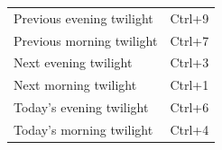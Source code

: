 \begin{tabular}{ll}
  Previous evening twilight & Ctrl+9 \\
  Previous morning twilight & Ctrl+7 \\
  Next evening twilight     & Ctrl+3 \\
  Next morning twilight     & Ctrl+1 \\
  Today's evening twilight  & Ctrl+6 \\
  Today's morning twilight  & Ctrl+4 \\
\end{tabular}









